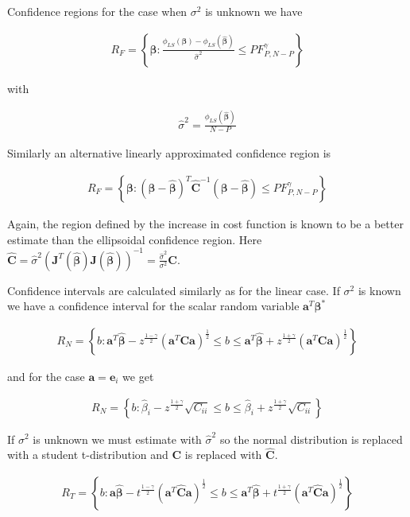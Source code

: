 \documentclass[12pt]{article}
\newcommand{\bv}[1]{\boldsymbol{#1}}
\begin{document}
Confidence regions for the case when $\sigma^2$ is unknown we have

\begin{align}
R_F = \left\{\bv{\beta}: \frac{\phi_{LS}(\bv{\beta}) - \phi_{LS}(\bv{\hat{\beta}})}{\hat{\sigma}^2} \le PF_{P,N-P}^{\gamma} \right\}
\end{align}

with

\begin{align}
\hat{\sigma}^2 = \frac{\phi_{LS}(\bv{\hat{\beta}})}{N-P}
\end{align}

Similarly an alternative linearly approximated confidence region is

\begin{align}
R_F = \left\{\bv{\beta}:\left(\bv{\beta}-\bv{\hat{\beta}}\right)^T\bv{\hat{C}}^{-1}\left(\bv{\beta}-\bv{\hat{\beta}}\right) \le PF_{P,N-P}^{\gamma} \right\}
\end{align}

Again, the region defined by the increase in cost function is known to be a better estimate than the ellipsoidal confidence region.
Here $\bv{\hat{C}} = \hat{\sigma}^2\left(\bv{J}^T(\bv{\hat{\beta}})\bv{J}(\bv{\hat{\beta}})\right)^{-1} = \frac{\hat{\sigma}^2}{\sigma^2}\bv{C}$.

Confidence intervals are calculated similarly as for the linear case.
If $\sigma^2$ is known we have a confidence interval for the scalar random variable $\bv{a}^T\bv{\beta^*}$

\begin{align}
R_N = \left\{b: \bv{a}^T\bv{\hat{\beta}} - z^{\frac{1-\gamma}{2}}(\bv{a}^T\bv{C}\bv{a})^{\frac{1}{2}} \le b \le \bv{a}^T\bv{\hat{\beta}} + z^{\frac{1+\gamma}{2}}(\bv{a}^T\bv{C}\bv{a})^{\frac{1}{2}}\right\}
\end{align}

and for the case $\bv{a} = \bv{e}_i$ we get

\begin{align}
R_N = \left\{b: \hat{\beta}_i - z^{\frac{1+\gamma}{2}} \sqrt{C_{ii}} \le b \le \hat{\beta}_i + z^{\frac{1+\gamma}{2}}\sqrt{C_{ii}}\right\}
\end{align}

If $\sigma^2$ is unknown we must estimate with $\hat{\sigma}^2$ so the normal distribution is replaced with a student t-distribution and $\bv{C}$ is replaced with $\bv{\hat{C}}$.

\begin{align}
R_T = \left\{b: \bv{a}\bv{\hat{\beta}} - t^{\frac{1-\gamma}{2}}(\bv{a}^T\bv{\hat{C}}\bv{a})^{\frac{1}{2}} \le b \le \bv{a}^T\bv{\hat{\beta}} + t^{\frac{1+\gamma}{2}}(\bv{a}^T\bv{\hat{C}}\bv{a})^{\frac{1}{2}}\right\}
\end{align}
\end{document}
